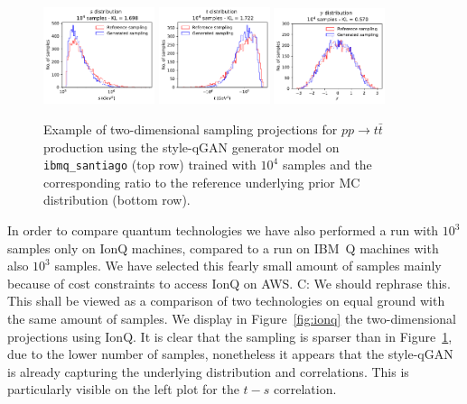 \documentclass[twocolumn,preprintnumbers,superscriptaddress]{revtex4-2}
\begin{document}
\begin{figure}
  \includegraphics[width=0.29\textwidth]{plots/hardware/ibm_santiago/s-distribution_LHCdata_10k.pdf}%
  \includegraphics[width=0.29\textwidth]{plots/hardware/ibm_santiago/t-distribution_LHCdata_10k.pdf}%
  \includegraphics[width=0.29\textwidth]{plots/hardware/ibm_santiago/y-distribution_LHCdata_10k.pdf}

  \caption{\label{fig:ibm}Example of two-dimensional sampling projections for
  $pp \rightarrow t\bar{t}$ production using the style-qGAN generator
  model on {\tt ibmq\_santiago} (top row) trained with $10^4$ samples and
  the corresponding ratio to the reference underlying prior MC
  distribution (bottom row).}
\end{figure}


In order to compare quantum technologies we have also performed a run
with $10^3$ samples only on IonQ machines, compared to a run on IBM~Q
machines with also $10^3$ samples. We have selected this fearly small
amount of samples mainly because of cost constraints to access IonQ on
AWS. {\color{red} C: We should rephrase this. This shall be viewed as a comparison of two technologies on equal
ground with the same amount of samples. We display in
Figure~\ref{fig:ionq} the two-dimensional projections using IonQ. It
is clear that the sampling is sparser than in Figure~\ref{fig:ibm},
due to the lower number of samples, nonetheless it appears that the
style-qGAN is already capturing the underlying distribution and
correlations. This is particularly visible on the left plot for the
$t-s$ correlation.}
\end{document}
